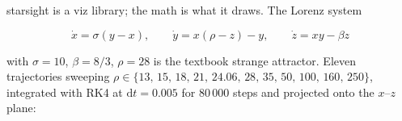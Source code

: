 starsight is a viz library; the math is what it draws. The Lorenz system

\[
\dot{x} = \sigma(y - x), \qquad
\dot{y} = x(\rho - z) - y, \qquad
\dot{z} = xy - \beta z
\]

with $\sigma = 10$, $\beta = 8/3$, $\rho = 28$ is the textbook strange
attractor. Eleven trajectories sweeping $\rho \in \{13,\, 15,\, 18,\, 21,\,
24.06,\, 28,\, 35,\, 50,\, 100,\, 160,\, 250\}$, integrated with RK4 at
$\mathrm{d}t = 0.005$ for 80\,000 steps and projected onto the $x$--$z$
plane:
